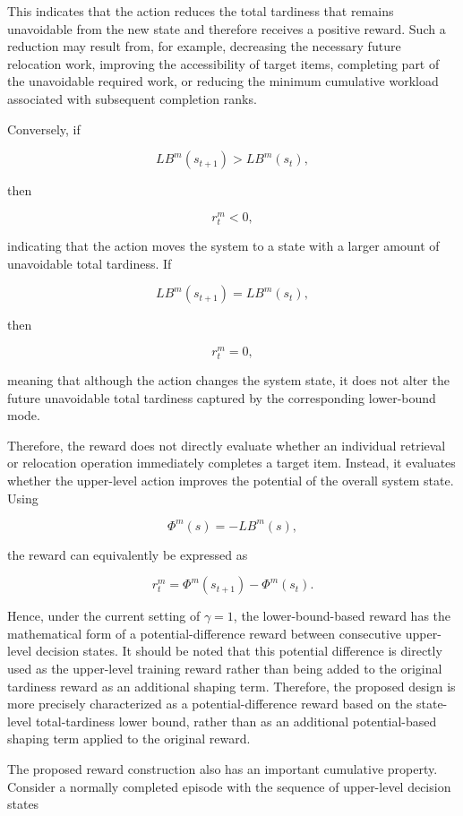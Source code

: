 This indicates that the action reduces the total tardiness that remains
unavoidable from the new state and therefore receives a positive reward. Such a
reduction may result from, for example, decreasing the necessary future
relocation work, improving the accessibility of target items, completing part
of the unavoidable required work, or reducing the minimum cumulative workload
associated with subsequent completion ranks.

Conversely, if

\[
LB^m(s_{t+1})
>
LB^m(s_t),
\]

then

\[
r_t^m<0,
\]

indicating that the action moves the system to a state with a larger amount of
unavoidable total tardiness. If

\[
LB^m(s_{t+1})
=
LB^m(s_t),
\]

then

\[
r_t^m=0,
\]

meaning that although the action changes the system state, it does not alter
the future unavoidable total tardiness captured by the corresponding
lower-bound mode.

Therefore, the reward does not directly evaluate whether an individual
retrieval or relocation operation immediately completes a target item. Instead,
it evaluates whether the upper-level action improves the potential of the
overall system state. Using

\[
\Phi^m(s)
=
-LB^m(s),
\]

the reward can equivalently be expressed as

\[
r_t^m
=
\Phi^m(s_{t+1})
-
\Phi^m(s_t).
\]

Hence, under the current setting of \(\gamma=1\), the lower-bound-based reward
has the mathematical form of a potential-difference reward between consecutive
upper-level decision states. It should be noted that this potential difference
is directly used as the upper-level training reward rather than being added to
the original tardiness reward as an additional shaping term. Therefore, the
proposed design is more precisely characterized as a potential-difference
reward based on the state-level total-tardiness lower bound, rather than as an
additional potential-based shaping term applied to the original reward.

The proposed reward construction also has an important cumulative property.
Consider a normally completed episode with the sequence of upper-level decision
states

